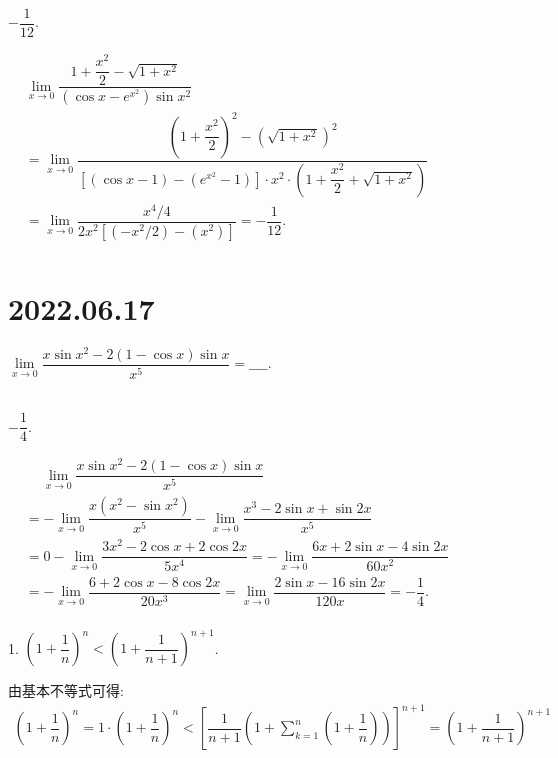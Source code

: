 \documentclass[lang=cn,12pt]{elegantbook}
\begin{document}
\begin{solution}
  $-\dfrac{1}{12}.$

  $\begin{aligned}
  & \lim\limits_{x \to 0} \dfrac{1+\dfrac{x^2}{2} - \sqrt{1+x^2}}{(\cos x - e^{x^2})\sin x^2} \\
  &= \lim\limits_{x\to 0} \dfrac{\left(1+\dfrac{x^2}{2}\right)^2-\left(\sqrt{1+x^2}\right)^2}{
    \left[(\cos x - 1) -\left(e^{x^2} - 1\right)\right] \cdot x^2 
    \cdot \left(1+\dfrac{x^2}{2}+\sqrt{1+x^2}\right)
  }\\
  &= \lim\limits_{x\to 0} \dfrac{x^4/4}{
    2x^2 \left[\left(-x^2/2\right) -\left(x^2\right)\right]
  } = -\dfrac{1}{12}.\\
  \end{aligned}
  $
\end{solution}
\section*{2022.06.17}

$\lim\limits_{x \to 0} \dfrac{
  x\sin x^2 - 2(1-\cos x)\sin x}{x^5} = \_\_\_\_.$
\\ \\

\begin{solution}
  $-\dfrac{1}{4}.$

  $\begin{aligned}
  &\quad\  \lim\limits_{x \to 0} \dfrac{
    x\sin x^2 - 2(1-\cos x)\sin x}{x^5} \\
  &= -\lim\limits_{x \to 0} \dfrac{
    x(x^2-\sin x^2)}{x^5} - 
    \lim\limits_{x \to 0} \dfrac{
    x^3-2\sin x + \sin 2x}{x^5} \\
  &= 0 - 
  \lim\limits_{x \to 0} \dfrac{
  3x^2-2\cos x + 2\cos 2x}{5x^4} 
  = - 
  \lim\limits_{x \to 0} \dfrac{
  6x + 2\sin x - 4\sin 2x}{60x^2} \\
  &= - 
  \lim\limits_{x \to 0} \dfrac{
  6 + 2\cos x - 8\cos 2x}{20x^3}
  = \lim\limits_{x \to 0} \dfrac{
  2\sin x - 16\sin 2x}{120x}
  = -\dfrac{1}{4}.\\
  \end{aligned}
  $
\end{solution}

\newpage



1. $\left(1+\dfrac{1}{n}\right)^n < \left(1 + \dfrac{1}{n+1}\right)^{n+1}$.
\newline

\begin{solution}
  由基本不等式可得:
  $$\begin{aligned}
  \left(1+\dfrac{1}{n}\right)^n = 1 \cdot \left(1+\dfrac{1}{n}\right)^n
  < \left[\dfrac{1}{n+1}\left(1+\sum_{k=1}^{n}\left(1 + \dfrac{1}{n}\right)\right)\right]^{n+1}
  = \left(1+\dfrac{1}{n+1}\right)^{n+1}
  \end{aligned}$$
\end{solution}
\end{document}
